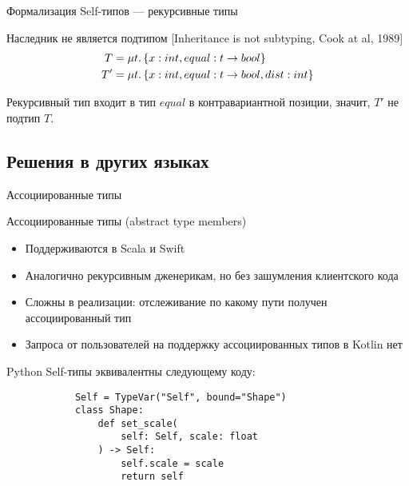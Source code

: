 \documentclass[handout,aspectratio=169,usenames,dvipsnames]{beamer}
\begin{document}
\begin{frame}[fragile]{Формализация Self-типов --- рекурсивные типы}
        \begin{block}{Наследник не является подтипом [Inheritance is not subtyping, Cook at al, 1989]}
            \vspace{-1em}
            \begin{align*}
                T &= \mu t \ldotp \{ x : int, equal : t \to bool \} \\
                T' &= \mu t \ldotp \{ x : int, equal : t \to bool, dist : int \}
            \end{align*}

            Рекурсивный тип входит в тип $equal$ в контравариантной позиции, значит, $T'$ не подтип $T$.
        \end{block}
    \end{frame}


    \subsection{Решения в других языках}

    \begin{frame}{Ассоциированные типы}
        \begin{block}{Ассоциированные типы (abstract type members)}
            \begin{itemize}
                \item Поддерживаются в Scala и Swift
                \item Аналогично рекурсивным дженерикам, но без зашумления клиентского кода
                \item Сложны в реализации: отслеживание по какому пути получен ассоциированный тип
                \item Запроса от пользователей на поддержку ассоциированных типов в Kotlin нет
            \end{itemize}
        \end{block}
    \end{frame}

    \begin{frame}[fragile]{Python}
        Self-типы эквивалентны следующему коду:
        \begin{verbatim}
            Self = TypeVar("Self", bound="Shape")
            class Shape:
                def set_scale(
                    self: Self, scale: float
                ) -> Self:
                    self.scale = scale
                    return self
        \end{verbatim}
    \end{frame}
\end{document}
